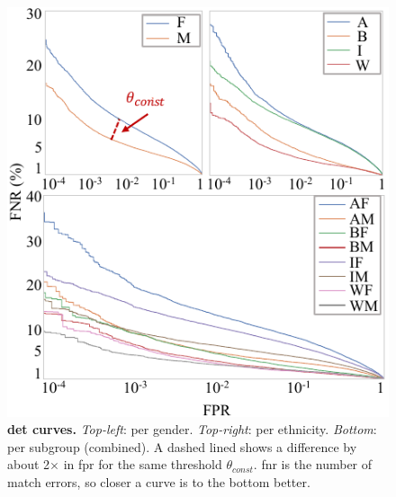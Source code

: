 \begin{figure}[!t] 
	\centering    
	\includegraphics[width=\linewidth]{figures/detcurve-improved.pdf}
		\caption{\textbf{\gls{det} curves.} \emph{Top-left}: per gender. \emph{Top-right}: per ethnicity. \emph{Bottom}: per subgroup (\ie combined). A dashed lined shows a difference by about 2$\times$ in \gls{fpr} for the same threshold $\theta_{const}$. \gls{fnr} is the number of match errors, so closer a curve is to the bottom better.}
\label{fig:detcurves} 
\end{figure} 

